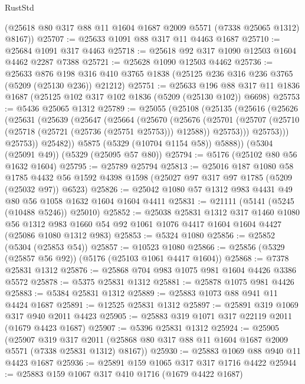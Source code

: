 \begin{lexlean}{RustStd}
\begin{coremodule}
      (@25618 @80 @317 @88 @11 @1604 @1687 @2009 @5571 (@7338 @25065 @1312) @8167))
@25707 := @25633 @1091 @88 @317 @11 @4463 @1687
@25710 := @25684 @1091 @317 @4463
@25718 := @25618 @92 @317 @1090 @12503 @1604 @4462 @2287 @7388
@25721 := @25628 @1090 @12503 @4462
@25736 := @25633
    @876
    @198
    @316
    @410
    @3765
    @1838
    (@25125 @236 @316 @236 @3765 (@5209 (@25130 @236)) @21212)
@25751 := @25633
    @196
    @88
    @317
    @11
    @1836
    @1687
    (@25125 @102 @317 @102 @1836 (@5209 (@25130 @102)) @6698)
@25753 := @5436 @25065 @1312
@25789 := @25055
    (@25108
      (@25135
        (@25616
          (@25626
            (@25631
              (@25639
                (@25647
                  (@25664
                    (@25670
                      (@25676
                        (@25701
                          (@25707
                            (@25710 (@25718 (@25721 (@25736 (@25751 @25753))) @12588))
                            @25753)))
                      @25753)))
                @25753))
            @25482))
        @5875
        (@5329 (@10704 @1154 @58))
        @5888))
    (@5304 (@25091 @49))
    (@5329 (@25095 @57 @80))
@25794 := @5176 (@25102 @80 @56 @1632 @1604)
@25795 := @25789 @25794
@25813 := @25016
    @187
    @1080
    @58
    @1785
    @4432
    @56
    @1592
    @4398
    @1598
    (@25027 @97 @317 @97 @1785 (@5209 (@25032 @97)) @6523)
@25826 := @25042 @1080 @57 @1312 @983 @4431 @49 @80 @56 @1058 @1632 @1604 @1604 @4411
@25831 := @21111 (@5141 (@5245 (@10488 @5246)) @25010)
@25852 := @25038
    @25831
    @1312
    @317
    @1460
    @1080
    @56
    @1312
    @983
    @1660
    @54
    @92
    @1061
    @1076
    @4417
    @1604
    @1604
    @4427
    (@25086 @1080 @1312 @983)
@25853 := @5324 @1080
@25856 := @25852 (@5304 (@25853 @54))
@25857 := @10523 @1080
@25866 := @25856 (@5329 (@25857 @56 @92)) (@5176 (@25103 @1061 @4417 @1604))
@25868 := @7378 @25831 @1312
@25876 := @25868 @704 @983 @1075 @981 @1604 @4426 @3386 @5572
@25878 := @5375 @25831 @1312
@25881 := @25878 @1075 @981 @4426
@25883 := @5384 @25831 @1312
@25889 := @25883 @1073 @88 @941 @11 @4424 @1687
@25891 := @12525 @25831 @1312
@25897 := @25891 @319 @1069 @317 @940 @2011 @4423
@25905 := @25883 @319 @1071 @317 @22119 @2011 (@1679 @4423 @1687)
@25907 := @5396 @25831 @1312
@25924 := @25905
    (@25907
      @319
      @317
      @2011
      (@25868 @80 @317 @88 @11 @1604 @1687 @2009 @5571 (@7338 @25831 @1312) @8167))
@25930 := @25883 @1069 @88 @940 @11 @4423 @1687
@25936 := @25891 @159 @1065 @317 @317 @1716 @4422
@25944 := @25883 @159 @1067 @317 @410 @1716 (@1679 @4422 @1687)

\end{coremodule}
\end{lexlean}

